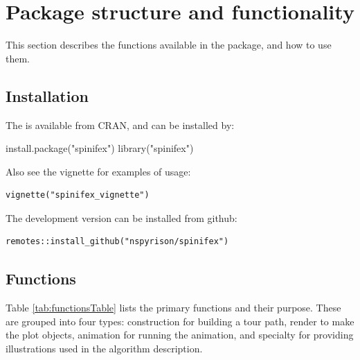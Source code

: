 \hypertarget{sec:usage}{%
\section{Package structure and functionality}\label{sec:usage}}

This section describes the functions available in the package, and how
to use them.

\hypertarget{installation}{%
\subsection{Installation}\label{installation}}

The  is available from CRAN, and can be installed by:

\begin{Schunk}
\begin{Sinput}
install.package("spinifex")
library("spinifex")
\end{Sinput}
\end{Schunk}

\noindent Also see the vignette for examples of usage:

\begin{verbatim}
vignette("spinifex_vignette")
\end{verbatim}

\noindent The development version can be installed from github:

\begin{verbatim}
remotes::install_github("nspyrison/spinifex") 
\end{verbatim}

\hypertarget{functions}{%
\subsection{Functions}\label{functions}}

Table \ref{tab:functionsTable} lists the primary functions and their
purpose. These are grouped into four types: construction for building a
tour path, render to make the plot objects, animation for running the
animation, and specialty for providing illustrations used in the
algorithm description.

